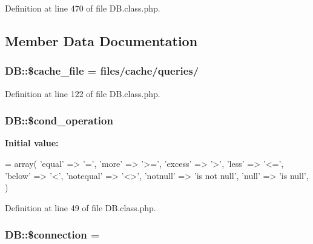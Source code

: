 Definition at line 470 of file D\+B.\+class.\+php.



\subsection{Member Data Documentation}
\hypertarget{classDB_a9952a27cbf07942e5bb8853ab95b5bdb}{}
\subsubsection[{\$cache\+\_\+file}]{\setlength{\rightskip}{0pt plus 5cm}D\+B\+::\$cache\+\_\+file = \textquotesingle{}files/cache/queries/\textquotesingle{}}\label{classDB_a9952a27cbf07942e5bb8853ab95b5bdb}


Definition at line 122 of file D\+B.\+class.\+php.

\hypertarget{classDB_a85f8f65c37474b0e65d844e1f01f39b0}{}
\subsubsection[{\$cond\+\_\+operation}]{\setlength{\rightskip}{0pt plus 5cm}D\+B\+::\$cond\+\_\+operation}\label{classDB_a85f8f65c37474b0e65d844e1f01f39b0}
{\bfseries Initial value\+:}
\begin{DoxyCode}
= array(
        \textcolor{stringliteral}{'equal'} => \textcolor{charliteral}{'='},
        \textcolor{stringliteral}{'more'} => \textcolor{stringliteral}{'>='},
        \textcolor{stringliteral}{'excess'} => \textcolor{charliteral}{'>'},
        \textcolor{stringliteral}{'less'} => \textcolor{stringliteral}{'<='},
        \textcolor{stringliteral}{'below'} => \textcolor{charliteral}{'<'},
        \textcolor{stringliteral}{'notequal'} => \textcolor{stringliteral}{'<>'},
        \textcolor{stringliteral}{'notnull'} => \textcolor{stringliteral}{'is not null'},
        \textcolor{stringliteral}{'null'} => \textcolor{stringliteral}{'is null'},
    )
\end{DoxyCode}


Definition at line 49 of file D\+B.\+class.\+php.

\hypertarget{classDB_ac9071e31f8241ad644430537f39a16ce}{}
\subsubsection[{\$connection}]{\setlength{\rightskip}{0pt plus 5cm}D\+B\+::\$connection = \textquotesingle{}\textquotesingle{}}\label{classDB_ac9071e31f8241ad644430537f39a16ce}


